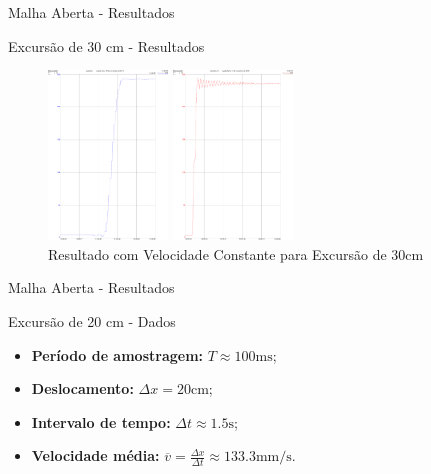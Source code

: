 \documentclass[10pt]{beamer}
\begin{document}
\begin{frame}[fragile]{Malha Aberta - Resultados}



\begin{block}{Excursão de 30 cm - Resultados}

\begin{figure}[!htb]
    \centering
    
    \begin{minipage}{.45\textwidth}
        \centering
        \includegraphics[width=\linewidth,height=4.5cm]{figures/resultados/malha_aberta_1/trajetoriaObtidaModelada.pdf}
        \caption{Resultado com Velocidade Modelada para Excursão de 30cm}
        \label{trajetoriaObtidaModelada}
    \end{minipage}%
    \hspace{0.1cm}
    \begin{minipage}{0.45\textwidth}
        \centering
        \includegraphics[width=1\linewidth,height=4.5cm]{figures/resultados/malha_aberta_1/trajetoriaObtidaVConstante.pdf}
        \caption{Resultado com Velocidade Constante para Excursão de 30cm}
        \label{trajetoriaObtidaVConstante}
    \end{minipage}
\end{figure}
\end{block}
\end{frame}

\begin{frame}[fragile]{Malha Aberta - Resultados}
\begin{block}{Excursão de 20 cm - Dados}
\begin{itemize}
	\item \textbf{Período de amostragem: } $T \approx 100 \mathrm{ms}$;
	\item \textbf{Deslocamento: } $\Delta x = 20 \mathrm{cm}$;
	\item \textbf{Intervalo de tempo: } $\Delta t \approx 1.5 \mathrm{s}$;
	\item \textbf{Velocidade média: } $\overline{v} = \frac{\Delta x}{\Delta t} \approx 133.3\mathrm{mm}/\mathrm{s}$.
	
\end{itemize}
\end{block}
\end{frame}
\end{document}
